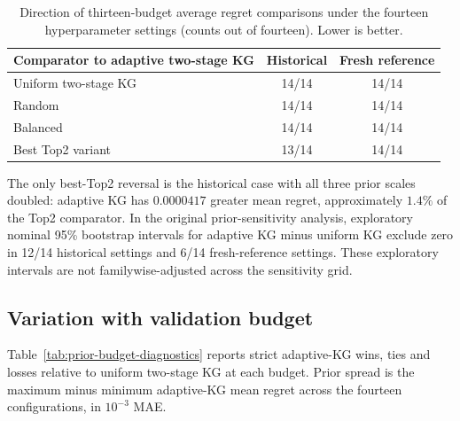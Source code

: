 \documentclass[10pt,a4paper]{article}
\begin{document}
\begin{table}[htbp]
\centering
\small
\caption{Direction of thirteen-budget average regret comparisons under the
fourteen hyperparameter settings (counts out of fourteen). Lower is better.}
\label{tab:prior-aggregate}
\begin{tabular}{lcc}
\toprule
Comparator to adaptive two-stage KG & Historical & Fresh reference\\
\midrule
Uniform two-stage KG & 14/14 & 14/14\\
Random & 14/14 & 14/14\\
Balanced & 14/14 & 14/14\\
Best Top2 variant & 13/14 & 14/14\\
\bottomrule
\end{tabular}
\end{table}

The only best-Top2 reversal is the historical case with all three prior
scales doubled: adaptive KG has $0.0000417$ greater mean regret, approximately
$1.4\%$ of the Top2 comparator. In the original prior-sensitivity analysis, exploratory nominal 95\% bootstrap intervals for
adaptive KG minus uniform KG exclude zero in 12/14 historical settings and
6/14 fresh-reference settings. These exploratory intervals are not
familywise-adjusted across the sensitivity grid.

\subsection{Variation with validation budget}
Table~\ref{tab:prior-budget-diagnostics} reports strict adaptive-KG wins,
ties and losses relative to uniform two-stage KG at each budget. Prior spread
is the maximum minus minimum adaptive-KG mean regret across the fourteen
configurations, in $10^{-3}$ MAE.
\end{document}
